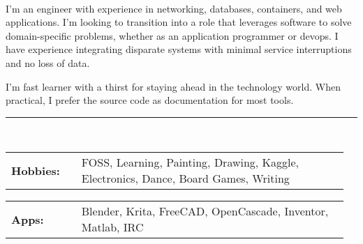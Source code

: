 \documentclass[10pt,letterpaper]{article}
\newcommand{\tzlarrow}{(0,0) -- (0.2,0) -- (0.3,0.2) -- (0.2,0.4) -- (0,0.4) -- (0.1,0.2) -- cycle;}
\newcommand{\larrow}[1]
{\begin{tikzpicture}[scale=0.58]
	 \filldraw[fill=#1!100,draw=#1!100!black]  \tzlarrow
 \end{tikzpicture}
}
\newcommand{\metasection}[2]{
	\begin{tabular*}{0.5\linewidth}{p{0.20\linewidth} p{0.76\linewidth}}
		\larrow{bgcol}\normalsize{\textbf{\textcolor{sectcol}{#1}}}&#2\\
	\end{tabular*}
}
\newcommand{\spread}{7pt}
\begin{document}
\pagestyle{fancy}

\begin{minipage}[t]{0.485\textwidth}



\vspace{\spread}

\hspace{-0.25\linewidth}\colorbox{bgcol}{}
\setlength{\parindent}{5mm}

\vspace{-0.1cm}\\
\small{I'm an engineer with experience in networking, databases, containers,
and web applications. I'm looking to transition into a role that
leverages software to solve domain-specific problems, whether as an
application programmer or devops. I have experience integrating
disparate systems with minimal service interruptions and no loss of data.}

\small{I'm fast learner with a thirst for staying ahead in the technology world.
When practical, I prefer the source code as documentation for most tools.}\\[-2pt]
\textcolor{softcol}{\hrule}
\setlength{\parindent}{0mm}
\vspace{\spread}\\
\metasection{Hobbies:}{FOSS, Learning, Painting, Drawing, Kaggle, Electronics, Dance, Board Games, Writing}
\metasection{Apps:}{Blender, Krita, FreeCAD, OpenCascade, Inventor, Matlab, IRC}
\end{minipage}
\hfill
\end{document}
